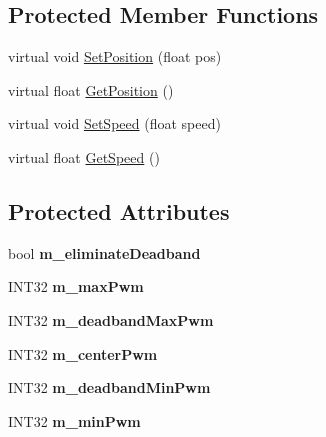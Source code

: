 \subsection*{\-Protected \-Member \-Functions}
\begin{DoxyCompactItemize}
\item 
virtual void \hyperlink{classPWM_a93e43862c48e9a06d95bd916b77c183a}{\-Set\-Position} (float pos)
\item 
virtual float \hyperlink{classPWM_a2f5dcbf84dc82c4b19098c4cc99d0390}{\-Get\-Position} ()
\item 
virtual void \hyperlink{classPWM_a947e5f6073da9e4d1b60db0c7791ca9c}{\-Set\-Speed} (float speed)
\item 
virtual float \hyperlink{classPWM_a42b209cbe7e63732918cbbcb55bfaac7}{\-Get\-Speed} ()
\end{DoxyCompactItemize}
\subsection*{\-Protected \-Attributes}
\begin{DoxyCompactItemize}
\item 
\hypertarget{classPWM_a80b83bf5f9751ceaf6439fccab8fe5d0}{bool {\bfseries m\-\_\-eliminate\-Deadband}}\label{classPWM_a80b83bf5f9751ceaf6439fccab8fe5d0}

\item 
\hypertarget{classPWM_a2494b8bdaa325b304c1f3ef9c2c0cf4f}{\-I\-N\-T32 {\bfseries m\-\_\-max\-Pwm}}\label{classPWM_a2494b8bdaa325b304c1f3ef9c2c0cf4f}

\item 
\hypertarget{classPWM_ad679eaccdc7edfd3eb2c6b52f41669a9}{\-I\-N\-T32 {\bfseries m\-\_\-deadband\-Max\-Pwm}}\label{classPWM_ad679eaccdc7edfd3eb2c6b52f41669a9}

\item 
\hypertarget{classPWM_ae675cc802a52f61413ea64823e843f93}{\-I\-N\-T32 {\bfseries m\-\_\-center\-Pwm}}\label{classPWM_ae675cc802a52f61413ea64823e843f93}

\item 
\hypertarget{classPWM_a51086c285825c581369217b0f4e4a527}{\-I\-N\-T32 {\bfseries m\-\_\-deadband\-Min\-Pwm}}\label{classPWM_a51086c285825c581369217b0f4e4a527}

\item 
\hypertarget{classPWM_abceceb853052bcb9c84a79a6e034d368}{\-I\-N\-T32 {\bfseries m\-\_\-min\-Pwm}}\label{classPWM_abceceb853052bcb9c84a79a6e034d368}

\end{DoxyCompactItemize}
